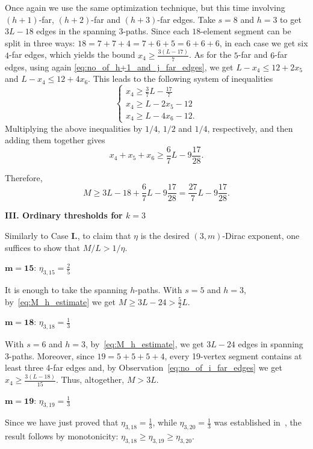 \documentclass[reqno, 12pt]{amsart}
\numberwithin{equation}{section}
\numberwithin{figure}{section}
\theoremstyle{plain}
\theoremstyle{definition}
\begin{document}
Once again we use the same optimization technique, but this time involving $(h+1)$-far, $(h+2)$-far and $(h+3)$-far edges. Take $s=8$ and $h=3$ to get $3L-18$ edges in the spanning $3$-paths. Since each $18$-element segment can be split in three ways: $18=7+7+4=7+6+5=6+6+6$, in each case we get six $4$-far edges, which yields the bound $x_4 \geq \frac{3(L-17)}{7}$. As for the $5$-far and $6$-far edges, using again \eqref{eq:no_of_h+1_and_j_far_edges}, we get $L - x_4 \leq 12+2x_5$ and $L - x_4 \leq 12+4x_6$. This leads to the following system of inequalities
\[
\begin{cases}
    x_4 \geq \frac37 L - \frac{17}7 \\
    x_4 \geq L - 2x_5 - 12\\
    x_4 \geq L - 4x_6 -12.
\end{cases}
\]
Multiplying the above inequalities by $1/4$, $1/2$ and $1/4$, respectively, and then adding them together gives
\[
x_4+x_5+x_6 \ge  \frac{6}{7} L - 9\frac{17}{28}.
\]

Therefore,
\[ M \geq 3L-18 + \frac{6}{7} L - 9\frac{17}{28} = \frac{27}7L- 9\frac{17}{28}.\]

\medskip

{\bf III. Ordinary thresholds for $k=3$}

\medskip

Similarly to Case {\bf I.}, to claim that $\eta$ is the desired $(3,m)$-Dirac exponent, one suffices to show that $M/L > 1/\eta$.

\medskip

    $\mathbf{m=15}$: $\eta_{3,15}=\frac25$

\medskip

It is enough to take the spanning $h$-paths. With $s=5$ and $h=3$, by~\eqref{eq:M_h_estimate} we get $M\geq 3L - 24 > \frac52L$.

\medskip

    $\mathbf{m=18}$: $\eta_{3,18}=\frac13$

\medskip

 With $s=6$ and $h=3$, by~\eqref{eq:M_h_estimate}, we get $3L-24$ edges in spanning 3-paths. Moreover, since $19=5+5+5+4$, every 19-vertex segment contains at least three 4-far edges and, by Observation~\eqref{eq:no_of_i_far_edges} we get $x_4\ge\frac{3(L-18)}{15}$. Thus, altogether, $M>3L$.


\medskip

    $\mathbf{m=19}$: $\eta_{3,19}=\frac13$

\medskip
Since we have just proved that $\eta_{3,18}=\frac13$, while $\eta_{3,20}=\frac13$ was established in~\cite{ADRRS}, the result follows by monotonicity: $\eta_{3,18}\ge\eta_{3,19}\ge\eta_{3,20}$.
\end{document}
